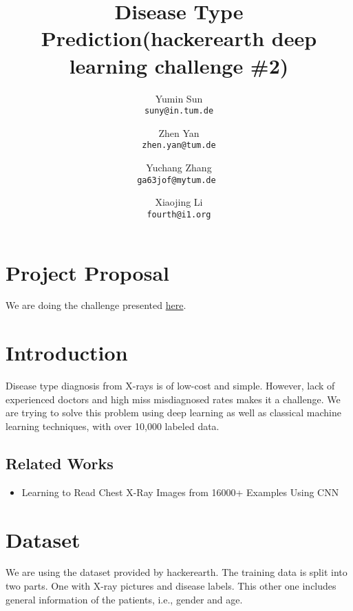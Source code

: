 \documentclass[10pt,twocolumn,letterpaper]{article}
\begin{document}
\title{Disease Type Prediction(hackerearth deep learning challenge \#2)}

\author{Yumin Sun\\
{\tt\small suny@in.tum.de}
\and
Zhen Yan\\
{\tt\small zhen.yan@tum.de}
\and
Yuchang Zhang\\
{\tt\small ga63jof@mytum.de }
\and
Xiaojing Li\\
{\tt\small fourth@i1.org}
}


\maketitle

%
%
\section*{Project Proposal}
We are doing the challenge presented \href{https://www.hackerearth.com/challenge/competitive/deep-learning-challenge-2/machine-learning/yes-a-question/}{here}.

\section{Introduction}
	Disease type diagnosis from X-rays is of low-cost and simple. However, lack of experienced doctors and high miss misdiagnosed rates makes it a challenge. We are trying to solve this problem using deep learning as well as classical machine learning techniques, with over 10,000 labeled data.
	
    \subsection{Related Works}
        \begin{itemize}
            \item Learning to Read Chest X-Ray Images from 16000+ Examples Using CNN \cite{dong2017learning}
        \end{itemize}

\section{Dataset}
We are using the dataset provided by hackerearth. The training data is split into two parts. One with X-ray pictures and disease labels. This other one includes general information of the patients, i.e., gender and age.
\end{document}
